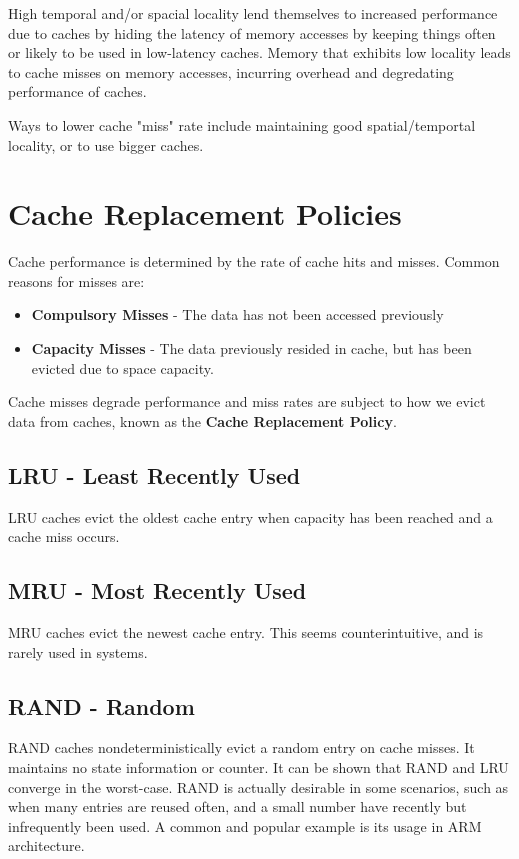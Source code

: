 \documentclass[twoside]{article}
\begin{document}
High temporal and/or spacial locality lend themselves to increased performance
due to caches by hiding the latency of memory accesses by keeping things often
or likely to be used in low-latency caches. Memory that exhibits low locality
leads to cache misses on memory accesses, incurring overhead and degredating
performance of caches.

Ways to lower cache "miss" rate include maintaining good spatial/temportal
locality, or to use bigger caches.

\section{Cache Replacement Policies}

Cache performance is determined by the rate of cache hits and misses. Common
reasons for misses are:
\begin{itemize}
    \item \textbf{Compulsory Misses} - The data has not been accessed previously
    \item \textbf{Capacity Misses} - The data previously resided in cache, but
        has been evicted due to space capacity.
\end{itemize}
Cache misses degrade performance and miss rates are subject to how we evict data
from caches, known as the \textbf{Cache Replacement Policy}.

\subsection{LRU - Least Recently Used}
LRU caches evict the oldest cache entry when capacity has been reached and a
cache miss occurs.

\subsection{MRU - Most Recently Used}
MRU caches evict the newest cache entry. This seems counterintuitive, and is
rarely used in systems.

\subsection{RAND - Random}
RAND caches nondeterministically evict a random entry on cache misses. It
maintains no state information or counter. It can be shown that RAND and LRU
converge in the worst-case. RAND is actually desirable in some scenarios, such
as when many entries are reused often, and a small number have recently but
infrequently been used. A common and popular example is its usage in ARM
architecture.
\end{document}
